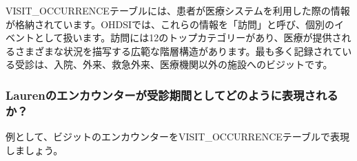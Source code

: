 \documentclass[
  11pt]{book}
\theoremstyle{definition}
\theoremstyle{definition}
\theoremstyle{definition}
\theoremstyle{definition}
\theoremstyle{remark}
\begin{document}
VISIT\_OCCURRENCEテーブルには、患者が医療システムを利用した際の情報が格納されています。OHDSIでは、これらの情報を「訪問」と呼び、個別のイベントとして扱います。訪問には12のトップカテゴリーがあり、医療が提供されるさまざまな状況を描写する広範な階層構造があります。最も多く記録されている受診は、入院、外来、救急外来、医療機関以外の施設へのビジットです。

\subsubsection*{Laurenのエンカウンターが受診期間としてどのように表現されるか？}\label{laurenux306eux30a8ux30f3ux30abux30a6ux30f3ux30bfux30fcux304cux53d7ux8a3aux671fux9593ux3068ux3057ux3066ux3069ux306eux3088ux3046ux306bux8868ux73feux3055ux308cux308bux304b}

例として、ビジットのエンカウンターをVISIT\_OCCURRENCEテーブルで表現しましょう。
\end{document}
